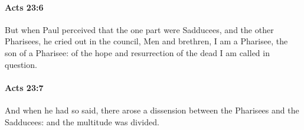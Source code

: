 		\paragraph{Acts 23:6} %
			\label{ACTS-23-6}

			But when Paul perceived that the one part were Sadducees, and the other Pharisees, he cried out in the council, Men and brethren, I am a Pharisee, the son of a Pharisee: of the hope and resurrection of the dead I am called in question.

			\begin{framed}
			\scriptsize
				\begin{compactdesc}
					\item[SBLG] 
				\end{compactdesc}
			\end{framed}

		\paragraph{Acts 23:7} %
			\label{ACTS-23-7}

			And when he had so said, there arose a dissension between the Pharisees and the Sadducees: and the multitude was divided.

